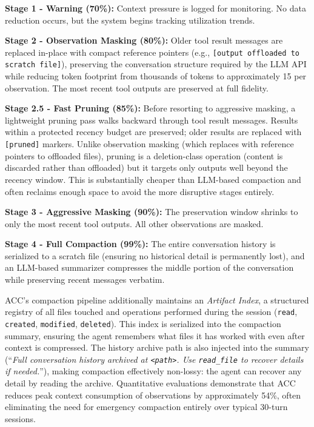 \begin{packeditemize}
\item \textbf{Stage 1 - Warning (70\%):} Context pressure is logged for monitoring. No data reduction occurs, but the system begins tracking utilization trends.
\item \textbf{Stage 2 - Observation Masking (80\%):} Older tool result messages are replaced in-place with compact reference pointers (e.g., \texttt{[output offloaded to scratch file]}), preserving the conversation structure required by the LLM API while reducing token footprint from thousands of tokens to approximately 15 per observation. The most recent tool outputs are preserved at full fidelity.
\item \textbf{Stage 2.5 - Fast Pruning (85\%):} Before resorting to aggressive masking, a lightweight pruning pass walks backward through tool result messages. Results within a protected recency budget are preserved; older results are replaced with \texttt{[pruned]} markers. Unlike observation masking (which replaces with reference pointers to offloaded files), pruning is a deletion-class operation (content is discarded rather than offloaded) but it targets only outputs well beyond the recency window. This is substantially cheaper than LLM-based compaction and often reclaims enough space to avoid the more disruptive stages entirely.
\item \textbf{Stage 3 - Aggressive Masking (90\%):} The preservation window shrinks to only the most recent tool outputs. All other observations are masked.
\item \textbf{Stage 4 - Full Compaction (99\%):} The entire conversation history is serialized to a scratch file (ensuring no historical detail is permanently lost), and an LLM-based summarizer compresses the middle portion of the conversation while preserving recent messages verbatim.
\end{packeditemize}

ACC's compaction pipeline additionally maintains an \emph{Artifact Index}, a structured registry of all files touched and operations performed during the session (\texttt{read}, \texttt{created}, \texttt{modified}, \texttt{deleted}). This index is serialized into the compaction summary, ensuring the agent remembers what files it has worked with even after context is compressed. The history archive path is also injected into the summary (``\emph{Full conversation history archived at \texttt{<path>}. Use \texttt{read\_file} to recover details if needed.}''), making compaction effectively non-lossy: the agent can recover any detail by reading the archive. Quantitative evaluations demonstrate that ACC reduces peak context consumption of observations by approximately 54\%, often eliminating the need for emergency compaction entirely over typical 30-turn sessions.


